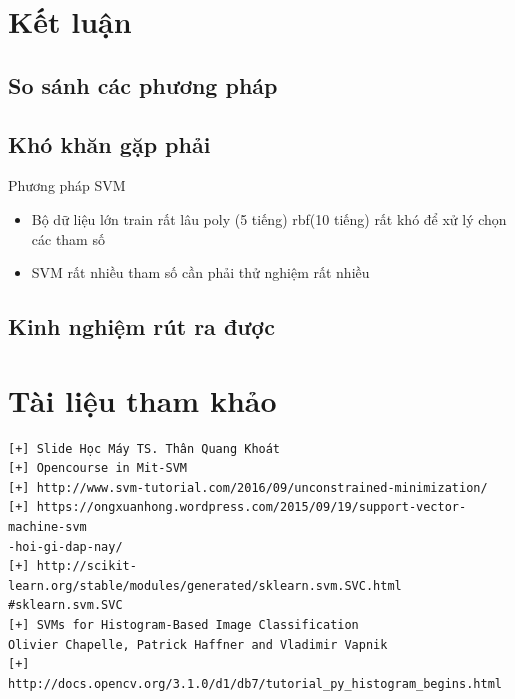 \documentclass[a4paper,12pt]{report}
\begin{document}
\chapter{Kết luận}
\section{So sánh các phương pháp}
\section{Khó khăn gặp phải}
Phương pháp SVM
\begin{itemize}
\item Bộ dữ liệu lớn train rất lâu poly (5 tiếng) rbf(10 tiếng) rất khó để xử lý chọn các tham số 
\item SVM rất nhiều tham số cần phải thử nghiệm rất nhiều

\end{itemize}
\section{Kinh nghiệm rút ra được}
\chapter{Tài liệu tham khảo}
\begin{verbatim}
[+] Slide Học Máy TS. Thân Quang Khoát
[+] Opencourse in Mit-SVM 
[+] http://www.svm-tutorial.com/2016/09/unconstrained-minimization/
[+] https://ongxuanhong.wordpress.com/2015/09/19/support-vector-machine-svm
-hoi-gi-dap-nay/
[+] http://scikit-learn.org/stable/modules/generated/sklearn.svm.SVC.html
#sklearn.svm.SVC 
[+] SVMs for Histogram-Based Image Classification
Olivier Chapelle, Patrick Haffner and Vladimir Vapnik
[+] http://docs.opencv.org/3.1.0/d1/db7/tutorial_py_histogram_begins.html


\end{verbatim}
\end{document}

